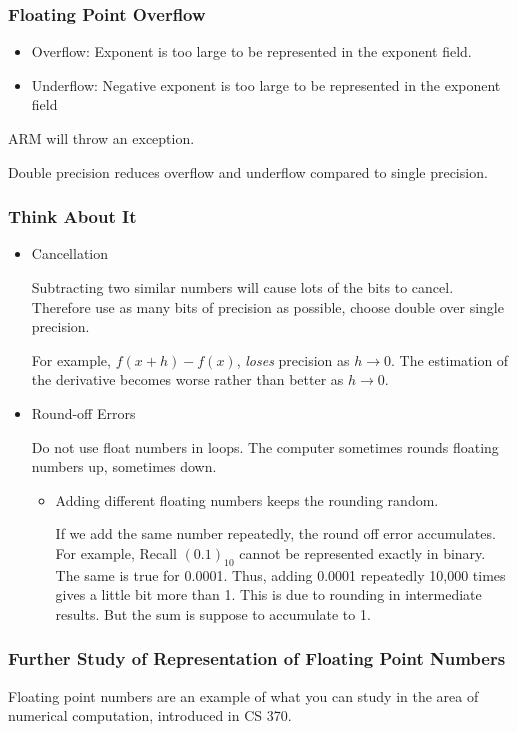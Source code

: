 \begin{frame}\frametitle{Floating Point Overflow}

\begin{itemize}
\item Overflow: Exponent is too large to be represented in the exponent field.
\item Underflow: Negative exponent is too large to be represented in the exponent field 
\end{itemize}
ARM will throw an exception.
\hfill\break

Double precision reduces overflow and underflow compared to single precision. 
\end{frame}
\begin{frame}\frametitle{Think About It}

\begin{itemize}
\item Cancellation

Subtracting two similar numbers will cause lots of the bits to cancel. Therefore use as many bits of precision as possible, choose double over single precision.

For example, $f(x+h)-f(x)$, \emph{loses} precision as $h\to 0$. The estimation of the derivative becomes worse rather than better as $h \to 0$.

\item Round-off Errors

Do not use float numbers in loops. The computer sometimes rounds floating numbers up, sometimes down.
\begin{itemize}
\item Adding different floating numbers keeps the rounding random.

If we add the same number repeatedly, the round off error accumulates. For example, Recall $(0.1)_{10}$ cannot be represented exactly in binary. The same is true for 0.0001. Thus, adding 0.0001 repeatedly 10,000 times gives a little bit more than 1. This is due to rounding in intermediate results. But the sum is suppose to accumulate to 1.
\end{itemize}
\end{itemize}
\end{frame}
\begin{frame}\frametitle{Further Study of Representation of Floating Point Numbers}
Floating point numbers are an example of what you can study in the area of numerical computation, introduced in CS 370.
\end{frame}